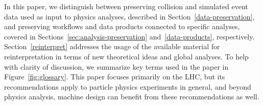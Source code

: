 \documentclass[11pt]{article}
\begin{document}
In this paper, we distinguish between preserving collision and simulated event data used as input to physics analyses, described in Section~\ref{data-preservation}, and preserving workflows and data products connected to specific analyses, covered in Sections~\ref{sec:analysis-preservation} and~\ref{data-products}, respectively. Section~\ref{reinterpret} addresses the usage of the available material for reinterpretation in terms of new theoretical ideas and global analyses.
To help with clarity of discussion, we summarize key terms used in the paper in Figure~\ref{fig:glossary}.
This paper focuses primarily on the LHC, but its recommendations apply to particle physics experiments in general, and beyond physics analysis, machine design can benefit from these recommendations as well.



\end{document}
